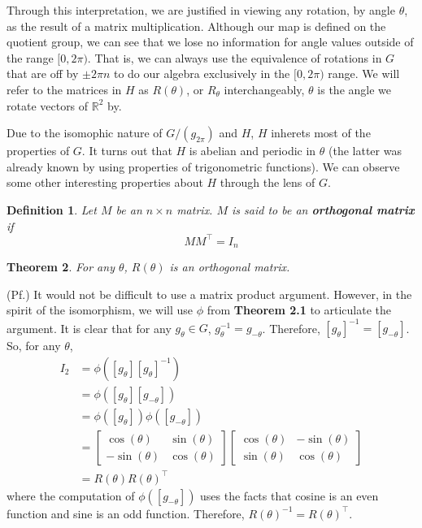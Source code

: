 \documentclass[10pt]{ucthesis}
\newcommand{\R}{\mathbb{R}}
\newtheorem{definition}{Definition}[chapter]
\newtheorem{theorem}[definition]{Theorem}
\begin{document}
Through this interpretation, we are justified in viewing any rotation, by angle $\theta$, as the result of a matrix multiplication. Although our map is defined on the quotient group, we can see that we lose no information for angle values outside of the range $[0,2\pi)$. That is, we can always use the equivalence of rotations in $G$ that are off by $\pm 2\pi n$ to do our algebra exclusively in the $[0,2\pi)$ range. We will refer to the matrices in $H$ as $R(\theta)$, or $R_\theta$ interchangeably, $\theta$ is the angle we rotate vectors of $\R^2$ by. 

Due to the isomophic nature of $G/(g_{2\pi})$ and $H$, $H$ inherets most of the properties of $G$. It turns out that $H$ is abelian and periodic in $\theta$ (the latter was already known by using properties of trigonometric functions). We can observe some other interesting properties about $H$ through the lens of $G$.

\begin{definition}
	Let $M$ be an $n\times n$ matrix. $M$ is said to be an \textbf{orthogonal matrix} if $$MM^\intercal=I_n$$
\end{definition}

\begin{theorem}
	For any $\theta$, $R(\theta)$ is an orthogonal matrix.
\end{theorem}
\noindent(Pf.) It would not be difficult to use a matrix product argument. However, in the spirit of the isomorphism, we will use $\phi$ from \textbf{Theorem 2.1} to articulate the argument. It is clear that for any $g_\theta \in G$, $g_\theta^{-1} = g_{-\theta}$. Therefore, $[g_\theta]^{-1} = [g_{-\theta}]$. So, for any $\theta$, 
\begin{equation}
	\begin{aligned}
		I_2 &= \phi([g_\theta][g_\theta]^{-1})\\
		 &= \phi([g_\theta][g_{-\theta}]) \\ 
		 &= \phi([g_\theta])\phi([g_{-\theta}])\\
		 &= \begin{bmatrix}
			\cos(\theta) & \sin(\theta) \\
			-\sin(\theta) & \cos(\theta)
		\end{bmatrix}
\begin{bmatrix}
			\cos(\theta) & -\sin(\theta) \\
			\sin(\theta) & \cos(\theta)
		\end{bmatrix}\\
		 &= R(\theta)R(\theta)^\intercal
	\end{aligned}
\end{equation}
where the computation of $\phi([g_{-\theta}])$ uses the facts that cosine is an even function and sine is an odd function. Therefore, $R(\theta)^{-1} = R(\theta)^\intercal$. \qedsymbol
\end{document}
